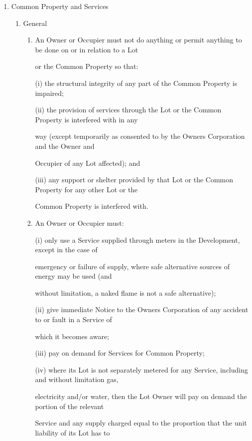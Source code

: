 \documentclass{article}
\begin{document}
\begin{enumerate}[label=\arabic*.]
\begin{enumerate}[label=\arabic{enumi}.\arabic*.]
\begin{enumerate}[label=(\arabic*)]
\end{enumerate}
\item  Common Property and Services 

\begin{enumerate}[label=(\arabic*)]
\item  General 

\begin{enumerate}[label=(\alph*)]
\item  An Owner or Occupier must not do anything or permit anything to be done on or in relation to a Lot 

or the Common Property so that: 

(i) the structural integrity of any part of the Common Property is impaired; 

(ii) the provision of services through the Lot or the Common Property is interfered with in any 

way (except temporarily as consented to by the Owners Corporation and the Owner and 

Occupier of any Lot affected); and 

(iii) any support or shelter provided by that Lot or the Common Property for any other Lot or the 

Common Property is interfered with. 

\item  An Owner or Occupier must: 

(i) only use a Service supplied through meters in the Development, except in the case of 

emergency or failure of supply, where safe alternative sources of energy may be used (and 

without limitation, a naked flame is not a safe alternative); 

(ii) give immediate Notice to the Owners Corporation of any accident to or fault in a Service of 

which it becomes aware; 

(iii) pay on demand for Services for Common Property; 

(iv) where its Lot is not separately metered for any Service, including and without limitation gas, 

\newpage

electricity and/or water, then the Lot Owner will pay on demand the portion of the relevant 

Service and any supply charged equal to the proportion that the unit liability of its Lot has to 


\end{enumerate}
\end{enumerate}
\end{enumerate}
\end{enumerate}
\end{document}
